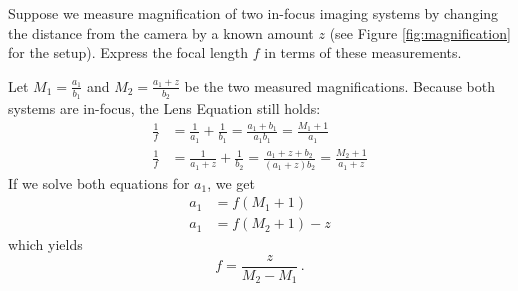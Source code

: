 \begin{question}
Suppose we measure magnification of two in-focus imaging systems by changing the distance from the camera by a known amount $z$ (see Figure \ref{fig:magnification} for the setup). 
Express the focal length $f$ in terms of these measurements.
\end{question}
\begin{answer}
Let $M_1 = \frac{a_1}{b_1}$ and $M_2 = \frac{a_1 + z}{b_2}$ be the two measured magnifications.
Because both systems are in-focus, the Lens Equation still holds:
\begin{align*}
    \frac{1}{f} &= \frac{1}{a_1} + \frac{1}{b_1} = \frac{a_1 + b_1}{a_1 b_1} = \frac{M_1 + 1}{a_1} \\
    \frac{1}{f} &= \frac{1}{a_1 + z} + \frac{1}{b_2} = \frac{a_1 + z + b_2}{(a_1 + z)b_2} = \frac{M_2 + 1}{a_1 + z}
\end{align*}
If we solve both equations for $a_1$, we get
\begin{align*}
    a_1 &= f(M_1 + 1) \\
    a_1 &= f(M_2 + 1) - z
\end{align*}
which yields
\begin{equation*}
    f = \frac{z}{M_2 - M_1} \,.
\end{equation*}
\end{answer}

